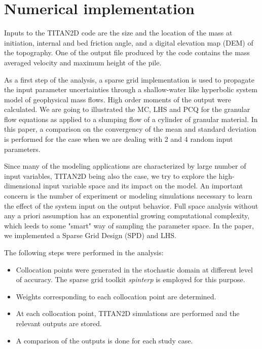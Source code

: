 \documentclass{article}
\begin{document}
\section{Numerical implementation}
Inputs to the TITAN2D code are the size and the location of the mass at 
initiation, internal and bed friction angle, and a digital elevation map (DEM)
of the topography. One of the output file produced by the code contains
the mass averaged velocity and maximum height of the pile.

As a first step of the analysis, a sparse grid implementation is used to 
propagate the input parameter uncertainties through a shallow-water 
like hyperbolic system model of geophysical mass flows. High order 
moments of the output were calculated. We are going to illustrated the MC, LHS and 
PCQ for the granular flow equations as applied to a slumping
flow of a cylinder of granular material.  
In this paper, a comparison on the convergency of the mean and standard
deviation is performed for the case when we are dealing with 2 and 4 random 
input parameters. 


Since many of the modeling applications are characterized by 
large number of input variables, TITAN2D being also the case, we try to
explore the high-dimensional input variable space and its impact on the model.
An important concern is the number of experiment or modeling simulations 
necessary to learn the effect of the system input on the output behavior.
Full space analysis without any a priori assumption has an exponential 
growing computational complexity, which leeds to some "smart" way of sampling
the parameter space. In the paper, we implemented a Sparse Grid Design (SPD) and LHS.

The following steps were performed in the analysis:
\begin{itemize}
\item Collocation points were generated in the stochastic domain
at different level of accuracy. The sparse grid toolkit \textit{spinterp}
is employed for this purpose.
\item Weights corresponding to each collocation point are determined.
\item At each collocation point, TITAN2D simulations are performed and
the relevant outputs are stored.
\item A comparison of the outputs is done for each study case.  
\end{itemize} 
\end{document}
